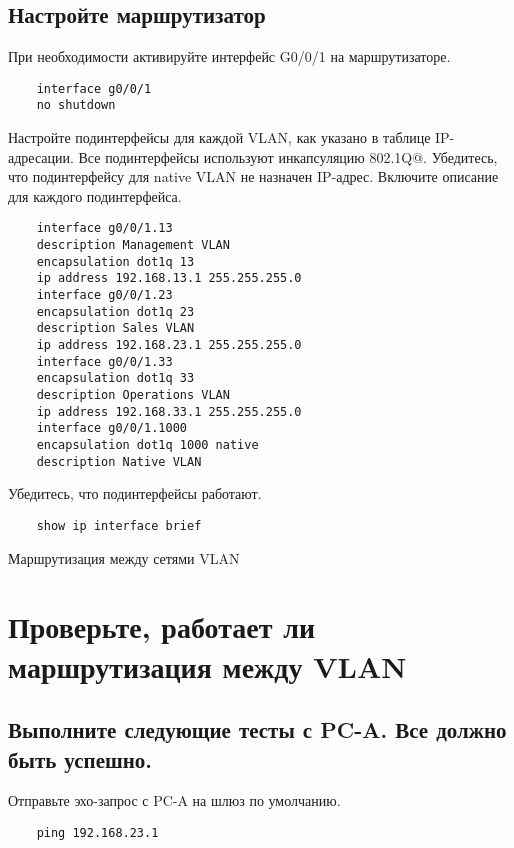 \subsection{Настройте маршрутизатор}

При необходимости активируйте интерфейс G0/0/1 на маршрутизаторе.

\begin{verbatim}
	interface g0/0/1
	no shutdown
\end{verbatim}

Настройте подинтерфейсы для каждой VLAN, как указано в таблице IP-адресации.
Все подинтерфейсы используют инкапсуляцию 802.1Q@.
Убедитесь, что подинтерфейсу для native VLAN не назначен IP-адрес.
Включите описание для каждого подинтерфейса.

\begin{verbatim}
	interface g0/0/1.13
	description Management VLAN
	encapsulation dot1q 13
	ip address 192.168.13.1 255.255.255.0
	interface g0/0/1.23
	encapsulation dot1q 23
	description Sales VLAN
	ip address 192.168.23.1 255.255.255.0
	interface g0/0/1.33
	encapsulation dot1q 33
	description Operations VLAN
	ip address 192.168.33.1 255.255.255.0
	interface g0/0/1.1000
	encapsulation dot1q 1000 native
	description Native VLAN
\end{verbatim}

Убедитесь, что подинтерфейсы работают.

\begin{verbatim}
	show ip interface brief
\end{verbatim}

\begin{image}
	\caption{Маршрутизация между сетями VLAN}
	\label{fig:switch:routing}
\end{image}

\section{Проверьте, работает ли маршрутизация между VLAN}
\subsection{Выполните следующие тесты с PC-A. Все должно быть успешно.}

Отправьте эхо-запрос с PC-A на шлюз по умолчанию.

\begin{verbatim}
	ping 192.168.23.1
\end{verbatim}

